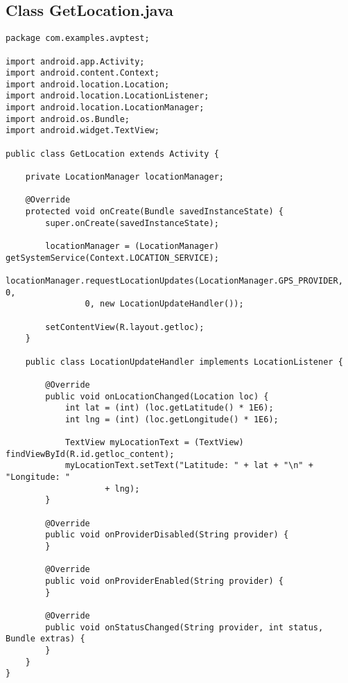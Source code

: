 \documentclass[letterpaper,twocolumn,10pt]{article}
\begin{document}
\subsection{Class GetLocation.java}
\begin{lstlisting}
package com.examples.avptest;

import android.app.Activity;
import android.content.Context;
import android.location.Location;
import android.location.LocationListener;
import android.location.LocationManager;
import android.os.Bundle;
import android.widget.TextView;

public class GetLocation extends Activity {

	private LocationManager locationManager;

	@Override
	protected void onCreate(Bundle savedInstanceState) {
		super.onCreate(savedInstanceState);

		locationManager = (LocationManager) getSystemService(Context.LOCATION_SERVICE);
		locationManager.requestLocationUpdates(LocationManager.GPS_PROVIDER, 0,
				0, new LocationUpdateHandler());

		setContentView(R.layout.getloc);
	}

	public class LocationUpdateHandler implements LocationListener {

		@Override
		public void onLocationChanged(Location loc) {
			int lat = (int) (loc.getLatitude() * 1E6);
			int lng = (int) (loc.getLongitude() * 1E6);
			
			TextView myLocationText = (TextView) findViewById(R.id.getloc_content);
			myLocationText.setText("Latitude: " + lat + "\n" + "Longitude: "
					+ lng);
		}

		@Override
		public void onProviderDisabled(String provider) {
		}

		@Override
		public void onProviderEnabled(String provider) {
		}

		@Override
		public void onStatusChanged(String provider, int status, Bundle extras) {
		}
	}
}

\end{lstlisting}

\lstset{language=XML}  
\end{document}
